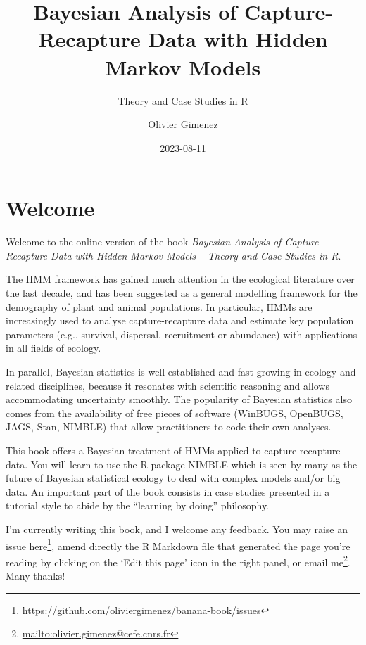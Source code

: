 \documentclass[
  12pt,
]{krantz}
\title{Bayesian Analysis of Capture-Recapture Data with Hidden Markov Models}
\subtitle{Theory and Case Studies in R}
\author{Olivier Gimenez}
\date{2023-08-11}
\renewcommand{\href}[2]{#2\footnote{\url{#1}}}
\begin{document}
\maketitle

\thispagestyle{empty}

\setlength{\abovedisplayskip}{-5pt}
\setlength{\abovedisplayshortskip}{-5pt}

{
\hypersetup{linkcolor=}
\setcounter{tocdepth}{2}
\tableofcontents
}
\listoffigures
\listoftables
\hypertarget{welcome}{%
\chapter*{Welcome}\label{welcome}}


Welcome to the online version of the book \emph{Bayesian Analysis of Capture-Recapture Data with Hidden Markov Models -- Theory and Case Studies in R}.

The HMM framework has gained much attention in the ecological literature over the last decade, and has been suggested as a general modelling framework for the demography of plant and animal populations. In particular, HMMs are increasingly used to analyse capture-recapture data and estimate key population parameters (e.g., survival, dispersal, recruitment or abundance) with applications in all fields of ecology.

In parallel, Bayesian statistics is well established and fast growing in ecology and related disciplines, because it resonates with scientific reasoning and allows accommodating uncertainty smoothly. The popularity of Bayesian statistics also comes from the availability of free pieces of software (WinBUGS, OpenBUGS, JAGS, Stan, NIMBLE) that allow practitioners to code their own analyses.

This book offers a Bayesian treatment of HMMs applied to capture-recapture data. You will learn to use the R package NIMBLE which is seen by many as the future of Bayesian statistical ecology to deal with complex models and/or big data. An important part of the book consists in case studies presented in a tutorial style to abide by the ``learning by doing'' philosophy.

I'm currently writing this book, and I welcome any feedback. You may raise an issue \href{https://github.com/oliviergimenez/banana-book/issues}{here}, amend directly the R Markdown file that generated the page you're reading by clicking on the `Edit this page' icon in the right panel, or \href{mailto:olivier.gimenez@cefe.cnrs.fr}{email me}. Many thanks!
\end{document}

